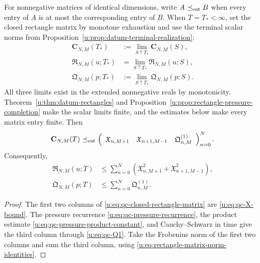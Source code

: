 \begin{proposition}
\label{u:prop:qc-closed-rectangle-matrix}
For nonnegative matrices of identical dimensions, write
\(A\preceq_{\rm ent}B\) when every entry of \(A\) is at most the
corresponding entry of \(B\).  When \(T=T_*<\infty\), set the closed
rectangle matrix by monotone exhaustion and use the terminal scalar norms from
Proposition~\ref{u:prop:datum-terminal-realization}:
\begin{align*}
 \mathbf C_{N,M}(T_*)&:=
 \lim_{S\uparrow T_*}\mathbf C_{N,M}(S),\\
 \mathfrak R_{N,M}(u;T_*)&=
 \lim_{S\uparrow T_*}\mathfrak R_{N,M}(u;S),\\
 \mathfrak Q_{N,M}(p;T_*)&:=
 \lim_{S\uparrow T_*}\mathfrak Q_{N,M}(p;S).
\end{align*}
All three limits exist in the extended nonnegative reals by monotonicity.
Theorem~\ref{u:thm:datum-rectangles} and
Proposition~\ref{u:prop:rectangle-pressure-completion} make the scalar limits
finite, and the estimates below make every matrix entry finite.
Then
\begin{equation}
 \mathbf C_{N,M}(T)
 \preceq_{\rm ent}
 \left(
 \begin{array}{ccc}
  \mathfrak X_{n,M+1}
  &\mathfrak X_{n+1,M-1}
  &\mathfrak Q^{(1)}_{n,M}
 \end{array}
 \right)_{n=0}^{N}.
 \label{u:eq:qc-closed-rectangle-matrix}
\end{equation}
Consequently,
\begin{align}
 \mathfrak R_{N,M}(u;T)
 &\le\sum_{n=0}^{N}
 \left(\mathfrak X_{n,M+1}^2
       +\mathfrak X_{n+1,M-1}^2\right),
 \label{u:eq:qc-closed-rectangle-frobenius}\\
 \mathfrak Q_{N,M}(p;T)
 &\le\sum_{n=0}^{N}\mathfrak Q^{(1)}_{n,M}.
 \label{u:eq:qc-closed-pressure-column}
\end{align}
\end{proposition}

\begin{proof}
The first two columns of \eqref{u:eq:qc-closed-rectangle-matrix} are
\eqref{u:eq:qc-X-bound}.  The pressure recurrence
\eqref{u:eq:qc-pressure-recurrence}, the product estimate
\eqref{u:eq:qc-pressure-product-constant}, and Cauchy--Schwarz in time give
the third column through \eqref{u:eq:qc-Q1}.  Take the Frobenius norm of the
first two columns and sum the third column, using
\eqref{u:eq:rectangle-matrix-norm-identities}.
\end{proof}


